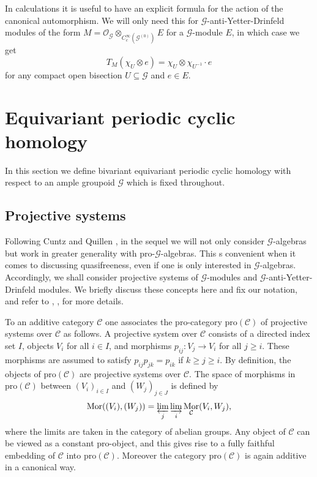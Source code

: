 \documentclass{amsart}
\newcommand{\G}{\mathcal{G}}
\newcommand{\OG}{\mathcal{O}_{\mathcal{G}}}
\newcommand{\ccinfty}{C_c^\infty}
\newcommand{\pro}{\mathrm{pro}}
\DeclareMathOperator{\Mor}{Mor}
\begin{document}
In calculations it is useful to have an explicit formula for the action of the canonical automorphism. We will only need this for $ \G $-anti-Yetter-Drinfeld modules of the form $ M = \OG \otimes_{\ccinfty(\G^{(0)})} E $ for a $ \G $-module $ E $, in which case we get 
$$
T_M(\chi_U \otimes e) = \chi_U \otimes \chi_{U^{-1}} \cdot e
$$
for any compact open bisection $ U \subseteq \G $ and $ e \in E $. 


\section{Equivariant periodic cyclic homology} \label{section:epch}

In this section we define bivariant equivariant periodic cyclic homology with respect to an ample groupoid $ \G $ which is fixed throughout. 

\subsection{Projective systems}

Following Cuntz and Quillen \cite{CUNTZ_QUILLEN_excision}, in the sequel we will not only consider $ \G $-algebras but work in greater generality with pro-$ \G $-algebras. This s convenient when it comes to discussing quasifreeness, even if one is only interested in $ \G $-algebras. Accordingly, we shall consider projective systems of $ \G $-modules 
and $ \G $-anti-Yetter-Drinfeld modules. We briefly discuss these concepts here and fix our notation, and refer 
to \cite{CUNTZ_QUILLEN_excision}, \cite{VOIGT_thesis}, \cite{VOIGT_equivariantperiodiccyclichomology} for more details. 

To an additive category $ \mathcal{C} $ one associates the pro-category $ \pro(\mathcal{C}) $ of projective systems over $ \mathcal{C} $ as follows. A projective system 
over $ \mathcal{C} $ consists of a directed index set $ I $, objects $ V_i $ for all $ i \in I $, and morphisms $ p_{ij}: V_j \rightarrow V_i $ for all $ j \geq i $. These 
morphisms are assumed to satisfy $ p_{ij} p_{jk} = p_{ik} $ if $ k \geq j \geq i $. By definition, the objects of $ \pro(\mathcal{C}) $ are projective systems over $ \mathcal{C} $. 
The space of morphisms in $ \pro(\mathcal{C}) $ between $ (V_i)_{i \in I} $ and $ (W_j)_{j \in J} $ is defined by 
\begin{equation*}
\Mor((V_i),(W_j)) = \varprojlim_{j} \varinjlim_i
\Mor_\mathcal{C}(V_i,W_j), 
\end{equation*}
where the limits are taken in the category of abelian groups. Any object of $ \mathcal{C} $ can be viewed as a constant pro-object, and this gives rise to a fully faithful embedding 
of $ \mathcal{C} $ into $ \pro(\mathcal{C}) $. Moreover the category $ \pro(\mathcal{C}) $ is again additive in a canonical way. 
\end{document}
